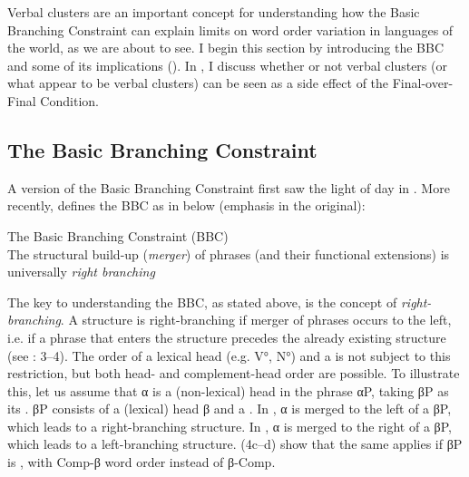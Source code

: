 \documentclass[output=paper, colorlinks, citecolor=brown]{langscibook}
\begin{document}
Verbal clusters are an important concept for understanding how the Basic Branching Constraint can explain limits on word order variation in languages of the world, as we are about to see. I begin this section by introducing the BBC and some of its implications (). In , I discuss whether or not verbal clusters (or what appear to be verbal clusters) can be seen as a side effect of the Final-over-Final Condition.


\subsection{The Basic Branching Constraint}\label{sec:sangfelt:2.1}

A version of the Basic Branching Constraint first saw the light of day in \citet{Haider1992}. More recently, \citet[3]{Haider2013} defines the BBC as in  below (emphasis in the original):

\ea
\label{ex:sangfelt:3}
The Basic Branching Constraint (BBC)\\
The structural build-up (\textit{merger}) of phrases (and their functional extensions) is 
universally \textit{right branching}
\z 


The key to understanding the BBC, as stated above, is the concept of \textit{right-branching}. A structure is right-branching if merger of phrases occurs to the left, i.e. if a phrase that enters the structure precedes the already existing structure (see \citealt{Haider2013}: 3–4). The order of a lexical head (e.g. V°, N°) and a  is not subject to this restriction, but both head- and complement-head order are possible. To illustrate this, let us assume that α is a (non-lexical) head in the phrase αP, taking βP as its . βP consists of a (lexical) head β and a . In , α is merged to the left of a  βP, which leads to a right-branching structure. In , α is merged to the right of a  βP, which leads to a left-branching structure. (4c–d) show that the same applies if βP is , with Comp-β word order instead of β{}-Comp.
\end{document}
